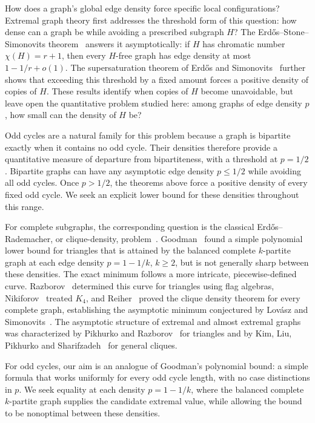 \documentclass[11pt]{article}
\numberwithin{equation}{section}
\begin{document}
How does a graph's global edge density force specific local configurations?
Extremal graph theory first addresses the threshold form of this question: how dense can a graph be while avoiding a prescribed subgraph $H$?
The Erd\H os--Stone--Simonovits theorem~\cite{erdos1966limit,erdos1946structure} answers it asymptotically: if $H$ has chromatic number $\chi(H)=r+1$, then every $H$-free graph has edge density at most $1-1/r+o(1)$.
The supersaturation theorem of Erd\H os and Simonovits~\cite{erdos1983supersaturated} further shows that exceeding this threshold by a fixed amount forces a positive density of copies of $H$.
These results identify when copies of $H$ become unavoidable, but leave open the quantitative problem studied here: among graphs of edge density $p$, how small can the density of $H$ be?

Odd cycles are a natural family for this problem because a graph is bipartite exactly when it contains no odd cycle.
Their densities therefore provide a quantitative measure of departure from bipartiteness, with a threshold at $p=1/2$.
Bipartite graphs can have any asymptotic edge density $p\le1/2$ while avoiding all odd cycles.
Once $p>1/2$, the theorems above force a positive density of every fixed odd cycle.
We seek an explicit lower bound for these densities throughout this range.

For complete subgraphs, the corresponding question is the classical Erd\H os--Rademacher, or clique-density, problem~\cite{erdos1962number}.
Goodman~\cite{goodman1959sets} found a simple polynomial lower bound for triangles that is attained by the balanced complete $k$-partite graph at each edge density $p=1-1/k$, $k\ge2$, but is not generally sharp between these densities.
The exact minimum follows a more intricate, piecewise-defined curve.
Razborov~\cite{razborov2008minimal} determined this curve for triangles using flag algebras, Nikiforov~\cite{nikiforov2010number} treated $K_4$, and Reiher~\cite{reiher2016clique} proved the clique density theorem for every complete graph, establishing the asymptotic minimum conjectured by Lov\'asz and Simonovits~\cite{lovasz1983number}.
The asymptotic structure of extremal and almost extremal graphs was characterized by Pikhurko and Razborov~\cite{pikhurko2017asymptotic} for triangles and by Kim, Liu, Pikhurko and Sharifzadeh~\cite{kim2020asymptotic} for general cliques.

For odd cycles, our aim is an analogue of Goodman's polynomial bound: a simple formula that works uniformly for every odd cycle length, with no case distinctions in $p$.
We seek equality at each density $p=1-1/k$, where the balanced complete $k$-partite graph supplies the candidate extremal value, while allowing the bound to be nonoptimal between these densities.
\end{document}
